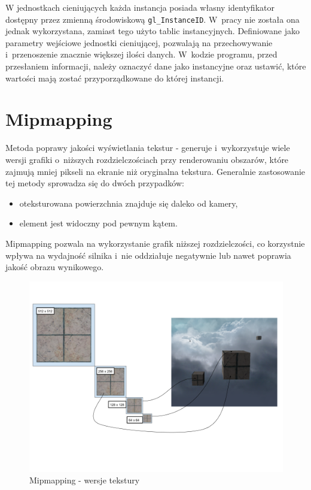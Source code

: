\documentclass[a4paper,twoside,12pt]{book}
\begin{document}
W jednostkach cieniujących każda instancja posiada własny identyfikator dostępny przez zmienną środowiskową \texttt{gl\_InstanceID}. W~pracy nie została ona jednak wykorzystana, zamiast tego użyto tablic instancyjnych. Definiowane jako parametry wejściowe jednostki cieniującej, pozwalają na przechowywanie i~przenoszenie znacznie większej ilości danych. W~kodzie programu, przed przesłaniem informacji, należy oznaczyć dane jako instancyjne oraz ustawić, które wartości mają zostać przyporządkowane do której instancji.

\section{Mipmapping}
Metoda poprawy jakości wyświetlania tekstur - generuje i~wykorzystuje wiele wersji grafiki o~niższych rozdzielczościach przy renderowaniu obszarów, które zajmują mniej pikseli na ekranie niż oryginalna tekstura. Generalnie zastosowanie tej metody sprowadza się do dwóch przypadków:
\begin{itemize}
    \item oteksturowana powierzchnia znajduje się daleko od kamery,
    \item element jest widoczny pod pewnym kątem.
\end{itemize}
Mipmapping pozwala na wykorzystanie grafik niższej rozdzielczości, co korzystnie wpływa na wydajność silnika i~nie oddziałuje negatywnie lub nawet poprawia jakość obrazu wynikowego.

\begin{figure}[H]
    \centering
    \includegraphics[width=\textwidth]{res/mipmapping_textures.png}
    \caption{Mipmapping - wersje tekstury}
    \label{fig:mipmapping_textures}
\end{figure}
\end{document}
